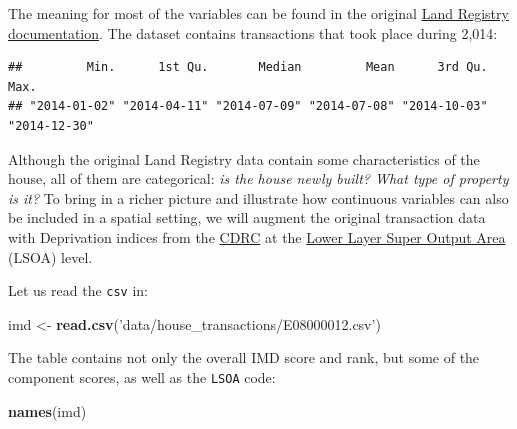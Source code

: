 \documentclass[]{book}
\newenvironment{Shaded}{\begin{snugshade}}{\end{snugshade}}
\newcommand{\KeywordTok}[1]{\textcolor[rgb]{0.13,0.29,0.53}{\textbf{#1}}}
\newcommand{\StringTok}[1]{\textcolor[rgb]{0.31,0.60,0.02}{#1}}
\newcommand{\CommentTok}[1]{\textcolor[rgb]{0.56,0.35,0.01}{\textit{#1}}}
\newcommand{\OperatorTok}[1]{\textcolor[rgb]{0.81,0.36,0.00}{\textbf{#1}}}
\newcommand{\NormalTok}[1]{#1}
\begin{document}
The meaning for most of the variables can be found in the original
\href{https://www.gov.uk/guidance/about-the-price-paid-data\#explanations-of-column-headers-in-the-ppd}{Land
Registry documentation}. The dataset contains transactions that took
place during 2,014:

\begin{Shaded}
\end{Shaded}

\begin{verbatim}
##         Min.      1st Qu.       Median         Mean      3rd Qu.         Max. 
## "2014-01-02" "2014-04-11" "2014-07-09" "2014-07-08" "2014-10-03" "2014-12-30"
\end{verbatim}

Although the original Land Registry data contain some characteristics of
the house, all of them are categorical: \emph{is the house newly built?
What type of property is it?} To bring in a richer picture and
illustrate how continuous variables can also be included in a spatial
setting, we will augment the original transaction data with Deprivation
indices from the
\href{https://data.cdrc.ac.uk/dataset/cdrc-english-indices-of-deprivation-2015-geodata-pack-liverpool-e08000012}{CDRC}
at the
\href{http://neighbourhood.statistics.gov.uk/HTMLDocs/nessgeography/superoutputareasexplained/output-areas-explained.htm}{Lower
Layer Super Output Area} (LSOA) level.

Let us read the \texttt{csv} in:

\begin{Shaded}
\begin{Highlighting}[]
\NormalTok{imd <-}\StringTok{ }\KeywordTok{read.csv}\NormalTok{(}\StringTok{'data/house_transactions/E08000012.csv'}\NormalTok{)}
\end{Highlighting}
\end{Shaded}

The table contains not only the overall IMD score and rank, but some of
the component scores, as well as the \texttt{LSOA} code:

\begin{Shaded}
\begin{Highlighting}[]
\KeywordTok{names}\NormalTok{(imd)}
\end{Highlighting}
\end{Shaded}
\end{document}
